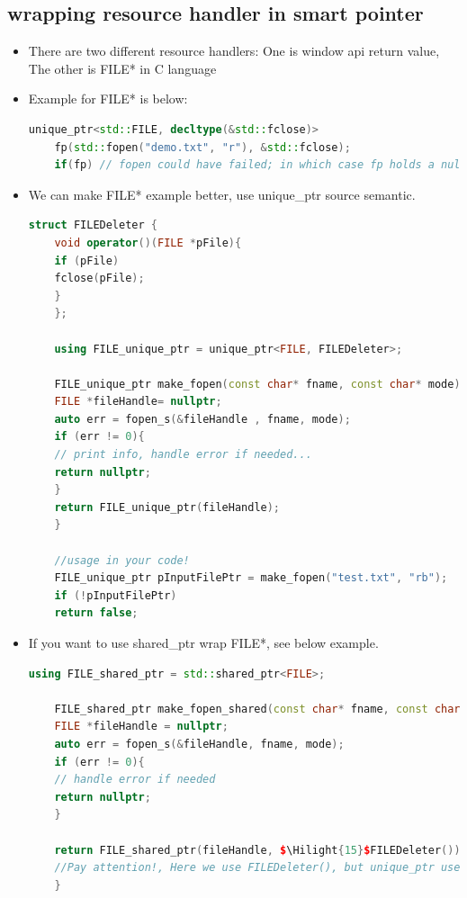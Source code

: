 \documentclass[a4paper,12pt,twoside]{book}
\newcommand{\Hilight}[1]{\makebox[0pt][l]{\color{yellow}\rule[-3pt]{#1em}{11pt}}}
\begin{document}
\subsection{wrapping resource handler in smart pointer}

\begin{itemize}
	\item There are two different resource handlers: One is window api return value, The other is FILE* in C language
	
	\item Example for FILE* is below:
	
	\begin{lstlisting}[frame=single, language=c++]
	unique_ptr<std::FILE, decltype(&std::fclose)> 
	fp(std::fopen("demo.txt", "r"), &std::fclose);
	if(fp) // fopen could have failed; in which case fp holds a null pointer
	\end{lstlisting}
	
	\item We can make FILE* example better, use unique\_ptr source semantic.
	\begin{lstlisting}[frame=single, language=c++]
	struct FILEDeleter {
	void operator()(FILE *pFile){
	if (pFile)
	fclose(pFile);
	}
	};
	
	using FILE_unique_ptr = unique_ptr<FILE, FILEDeleter>;
	
	FILE_unique_ptr make_fopen(const char* fname, const char* mode){
	FILE *fileHandle= nullptr;
	auto err = fopen_s(&fileHandle , fname, mode); 
	if (err != 0){
	// print info, handle error if needed...
	return nullptr;
	}
	return FILE_unique_ptr(fileHandle);
	}
	
	//usage in your code!
	FILE_unique_ptr pInputFilePtr = make_fopen("test.txt", "rb");
	if (!pInputFilePtr)
	return false;
	\end{lstlisting}
	
	\item If you want to use shared\_ptr wrap FILE*, see below example.
	\begin{lstlisting}[frame=single, language=c++]
	using FILE_shared_ptr = std::shared_ptr<FILE>;
	
	FILE_shared_ptr make_fopen_shared(const char* fname, const char* mode){
	FILE *fileHandle = nullptr;
	auto err = fopen_s(&fileHandle, fname, mode);
	if (err != 0){
	// handle error if needed
	return nullptr;
	}
	
	return FILE_shared_ptr(fileHandle, $\Hilight{15}$FILEDeleter());
	//Pay attention!, Here we use FILEDeleter(), but unique_ptr use FILEDeleter
	}
	\end{lstlisting}
	

\end{itemize}
\end{document}
